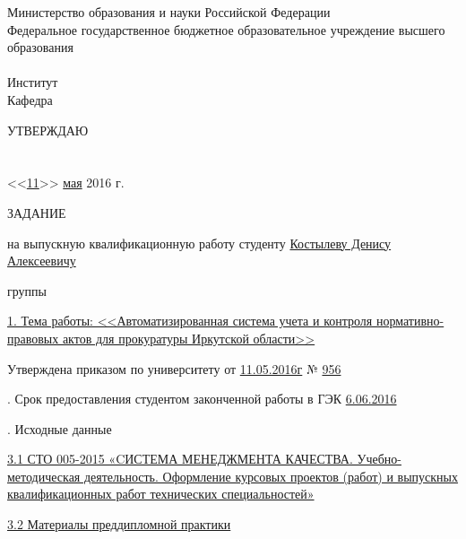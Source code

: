 \setcounter{page}{2}


\begin{center}
	Министерство образования и науки Российской Федерации \\
	Федеральное государственное бюджетное образовательное учреждение высшего образования \\
	\vspace{0.5cm}
	{\bf \textsc \university} \\
	\vspace{0.5cm}
	Институт \uline{\faculty} \\
	Кафедра \uline{\dept} \\
\end{center}

\begin{flushright}
	УТВЕРЖДАЮ \\
	\directorType \\
	 \
	 \\
	<<\uline{11}>> \uline{\phantom{MM}мая\phantom{MM}} 2016 г.
\end{flushright}

\begin{center}
	ЗАДАНИЕ
\end{center}

\noindent
на выпускную квалификационную работу студенту \uline{Костылеву Денису Алексеевичу \hfill}

\noindent
группы \uline{\group \hfill}

\noindent
\uline{1. Тема работы: <<Автоматизированная система учета и контроля нормативно-правовых актов для прокуратуры Иркутской области>> \hfill}

\noindent
Утверждена приказом по университету от \uline{\phantom{N}11.05.2016г\phantom{N}} № \uline{\phantom{N}956\phantom{N}}

. Срок предоставления студентом законченной работы в ГЭК \uline{\phantom{N}6.06.2016\phantom{N}}

. Исходные данные

\begin{addmargin}[1.25cm]{0.1cm}

	\uline{3.1 СТО 005-2015 «CИСТЕМА МЕНЕДЖМЕНТА КАЧЕСТВА. Учебно-методическая деятельность. Оформление курсовых проектов (работ) и выпускных квалификационных работ технических специальностей»\hfill}

	\noindent
	\uline{3.2 Материалы преддипломной практики\hfill}
\end{addmargin}

